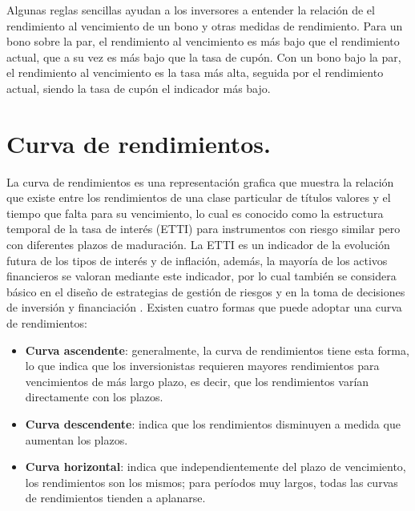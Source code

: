 \hspace*{0.4 cm} Algunas reglas sencillas ayudan a los inversores a entender la relaci\'on de el rendimiento al vencimiento de un bono y otras medidas de rendimiento. Para un bono sobre la par, el rendimiento al vencimiento es m\'as bajo que el rendimiento actual, que a su vez es m\'as bajo que la tasa de cup\'on. Con un bono bajo la par, el rendimiento al vencimiento es la tasa m\'as alta, seguida por el rendimiento actual, siendo la tasa de cup\'on el indicador m\'as bajo.


\section{Curva de rendimientos.}

\hspace*{0.4 cm} La curva de rendimientos es una representaci\'on grafica que muestra la relaci\'on que existe entre los rendimientos de una clase particular de t\'itulos valores y el tiempo que falta para su vencimiento, lo cual es conocido como la estructura temporal de la tasa de inter\'es (ETTI) para instrumentos con riesgo similar pero con diferentes plazos de maduraci\'on. La ETTI es un indicador de la evoluci\'on futura de los tipos de inter\'es y de inflaci\'on, adem\'as, la mayor\'ia de los activos financieros se valoran mediante este indicador, por lo cual tambi\'en se considera b\'asico en el dise\~no de estrategias de gesti\'on de riesgos y en la toma de decisiones de inversi\'on y financiaci\'on \cite{FR}. Existen cuatro formas que puede adoptar una curva de rendimientos:

\begin{itemize}
  \item \textbf{Curva ascendente}: generalmente, la curva de rendimientos tiene esta      forma, lo que indica que los inversionistas requieren mayores rendimientos     para vencimientos de m\'as largo plazo, es decir, que los rendimientos         var\'ian directamente con los plazos. 
  \item \textbf{Curva descendente}: indica que los rendimientos disminuyen a medida que   aumentan los plazos.
\end{itemize}

\begin{itemize}
   \item \textbf{Curva horizontal}: indica que independientemente del plazo de vencimiento, los rendimientos son los mismos; para per\'iodos muy largos, todas las      curvas de rendimientos tienden a aplanarse.
\end{itemize}


